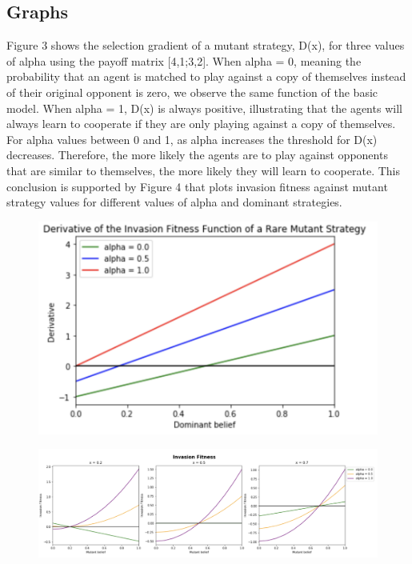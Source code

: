 \documentclass[]{llncs}
\begin{document}
\subsection{Graphs}

Figure 3 shows the selection gradient of a mutant strategy, D(x), for three values of alpha using the payoff matrix [4,1;3,2]. When alpha = 0, meaning the  probability that an agent is matched to play against a copy of themselves instead of their original opponent is zero, we observe the same function of the basic model. When alpha = 1, D(x) is always positive, illustrating that the agents will always learn to cooperate if they are only playing against a copy of themselves. For alpha values between 0 and 1, as alpha increases the threshold for D(x) decreases. Therefore, the more likely the agents are to play against opponents that are similar to themselves, the more likely they will learn to cooperate. This conclusion is supported by Figure 4 that plots invasion fitness against mutant strategy values for different values of alpha and dominant strategies. 

\begin{figure}
\centering
\includegraphics[width=12cm]{images/invasion_fitness_alpha}
\caption{ }
\end{figure}

\begin{figure}
\centering
\includegraphics[width=15cm]{images/inv_fit_alpha}
\caption{ }
\end{figure}
\end{document}
